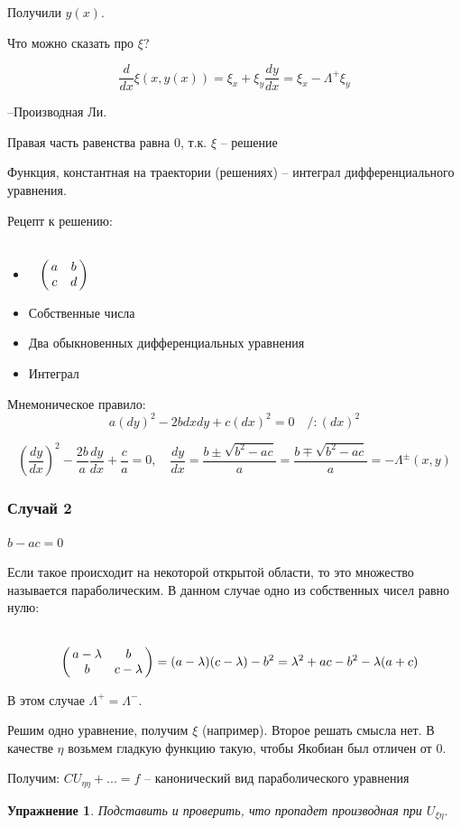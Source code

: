 \documentclass[12pt]{report}
\newtheorem{exercise}{Упражнение}
\begin{document}
Получили $y(x)$. 

Что можно сказать про $\xi$? 

$$\frac{d}{dx} \xi(x, y(x)) = \xi_x + \xi_y \frac{dy}{dx} = \xi_x - \Lambda^+ \xi_y$$

--Производная Ли. 

Правая часть равенства равна $0$, т.к. $\xi$ -- решение

Функция, константная на траектории (решениях) -- интеграл дифференциального уравнения. 

Рецепт к решению: 

\begin{itemize}
    \item  $\bordermatrix{
            ~ & ~ & ~ \cr
            ~ & a & b \cr
            ~ & c & d
            }$
    \item Собственные числа
    \item Два обыкновенных дифференциальных уравнения 
    \item Интеграл
\end{itemize}

Мнемоническое правило: 
$$a(dy) ^ 2 - 2b dx dy + c (dx) ^ 2 = 0 \quad /: (dx) ^ 2$$

$$(\frac{dy}{dx}) ^ 2 - \frac{2b}{a} \frac{dy}{dx} + \frac{c}{a} = 0, \quad \frac{dy}{dx} = \frac{b \pm \sqrt{b ^ 2 - ac}}{a} = \frac{b \mp \sqrt{b ^ 2 - ac}}{a} = - \Lambda^{\pm}(x, y) $$

\subsubsection{Случай 2}
$b - ac = 0$

Если такое происходит на некоторой открытой области, то это множество называется параболическим. В данном случае одно из собственных чисел равно нулю: 

\[
    \bordermatrix{
        ~ & ~ & ~ \cr
        ~ & a - \lambda & b \cr
        ~ & b & c - \lambda
    }
    = (a - \lambda) (c - \lambda) - b ^ 2 = \lambda ^ 2 + ac - b ^ 2 - \lambda (a + c)
\]

В этом случае $\Lambda^+ = \Lambda^-$.

Решим одно уравнение, получим $\xi$ (например). Второе решать смысла нет. В качестве $\eta$  возьмем гладкую функцию такую, чтобы Якобиан был отличен от $0$.

Получим: $C U_{\eta \eta} + ... = f$ -- канонический вид параболического уравнения

\begin{exercise}
    Подставить и проверить, что пропадет производная при $U_{\xi \eta}$.
\end{exercise}
\end{document}
